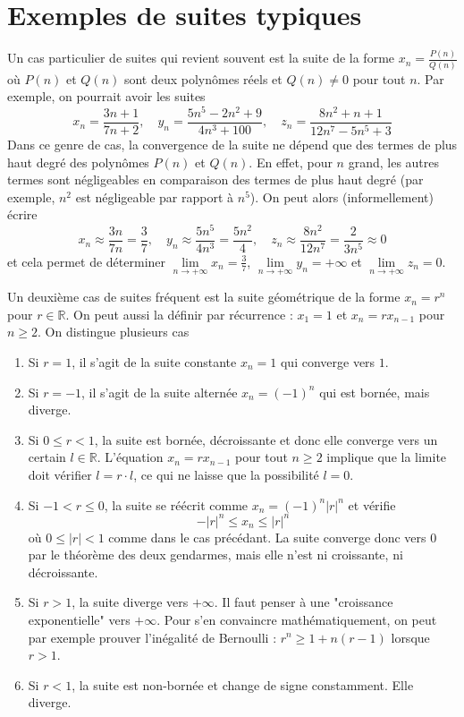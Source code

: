 \section{Exemples de suites typiques}
Un cas particulier de suites qui revient souvent est la suite de la forme $x_n = \frac{P(n)}{Q(n)}$ où $P(n)$ et $Q(n)$ sont deux polynômes réels et $Q(n) \neq 0$ pour tout $n$. Par exemple, on pourrait avoir les suites
$$x_n = \frac{3n+1}{7n+2}, \quad y_n = \frac{5n^5 - 2n^2 + 9}{4n^3 + 100}, \quad z_n = \frac{8n^2 + n + 1}{12n^7 - 5n^5 + 3}$$
Dans ce genre de cas, la convergence de la suite ne dépend que des termes de plus haut degré des polynômes $P(n)$ et $Q(n)$. En effet, pour $n$ grand, les autres termes sont négligeables en comparaison des termes de plus haut degré (par exemple, $n^2$ est négligeable par rapport à $n^5$). On peut alors (informellement) écrire
$$x_n \approx \frac{3n}{7n} = \frac{3}{7}, \quad y_n \approx \frac{5n^5}{4n^3} = \frac{5n^2}{4}, \quad z_n \approx \frac{8n^2}{12n^7} = \frac{2}{3n^5} \approx 0$$
et cela permet de déterminer $\lim \limits_{n \to +\infty}x_n = \frac{3}{7}$, $\lim \limits_{n \to +\infty}y_n = +\infty$ et $\lim \limits_{n \to +\infty} z_n = 0$.

Un deuxième cas de suites fréquent est la suite géométrique de la forme $x_n = r^n$ pour $r \in \mathbb R$. On peut aussi la définir par récurrence : $x_1 = 1$ et $x_{n} = r x_{n-1}$ pour $n \geq 2$. On distingue plusieurs cas

\begin{enumerate}
    \item Si $r = 1$, il s'agit de la suite constante $x_n = 1$ qui converge vers $1$.
    \item Si $r = -1$, il s'agit de la suite alternée $x_n = (-1)^n$ qui est bornée, mais diverge.
    \item Si $0 \leq r < 1$, la suite est bornée, décroissante et donc elle converge vers un certain $l \in \mathbb R$. L'équation $x_n = r x_{n-1}$ pour tout $n \geq 2$ implique que la limite doit vérifier $l = r \cdot l$, ce qui ne laisse que la possibilité $l = 0$.
    \item Si $-1 < r \leq 0$, la suite se réécrit comme $x_n = (-1)^n |r|^n$ et vérifie
    $$-|r|^n \leq x_n \leq |r|^n$$
    où $0 \leq |r| < 1$ comme dans le cas précédant. La suite converge donc vers $0$ par le théorème des deux gendarmes, mais elle n'est ni croissante, ni décroissante.
    \item Si $r > 1$, la suite diverge vers $+\infty$. Il faut penser à une "croissance exponentielle" vers $+\infty$. Pour s'en convaincre mathématiquement, on peut par exemple prouver l'inégalité de Bernoulli : $r^n \geq 1 + n(r-1)$ lorsque $r > 1$.
    \item Si $r < 1$, la suite est non-bornée et change de signe constamment. Elle diverge. 
\end{enumerate}
